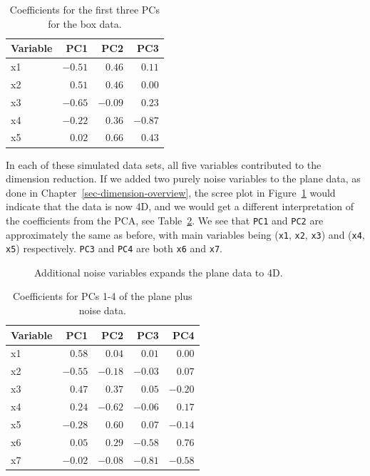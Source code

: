 \documentclass[
  letterpaper,
]{krantz}
\begin{document}
\begin{longtable}{lrrr}

\caption{\label{tbl-box-pcs}Coefficients for the first three PCs for the
box data.}

\tabularnewline

\toprule
Variable & PC1 & PC2 & PC3 \\ 
\midrule\addlinespace[2.5pt]
x1 & $-0.51$ & $0.46$ & $0.11$ \\ 
x2 & $0.51$ & $0.46$ & $0.00$ \\ 
x3 & $-0.65$ & $-0.09$ & $0.23$ \\ 
x4 & $-0.22$ & $0.36$ & $-0.87$ \\ 
x5 & $0.02$ & $0.66$ & $0.43$ \\ 
\bottomrule

\end{longtable}

In each of these simulated data sets, all five variables contributed to
the dimension reduction. If we added two purely noise variables to the
plane data, as done in Chapter~\ref{sec-dimension-overview}, the scree
plot in Figure~\ref{fig-plane-noise-scree} would indicate that the data
is now 4D, and we would get a different interpretation of the
coefficients from the PCA, see Table~\ref{tbl-plane-noise-pcs}. We see
that \texttt{PC1} and \texttt{PC2} are approximately the same as before,
with main variables being (\texttt{x1}, \texttt{x2}, \texttt{x3}) and
(\texttt{x4}, \texttt{x5}) respectively. \texttt{PC3} and \texttt{PC4}
are both \texttt{x6} and \texttt{x7}.

\begin{figure}


\caption{\label{fig-plane-noise-scree}Additional noise variables expands
the plane data to 4D.}

\end{figure}%

\begin{longtable}{lrrrr}

\caption{\label{tbl-plane-noise-pcs}Coefficients for PCs 1-4 of the
plane plus noise data.}

\tabularnewline

\toprule
Variable & PC1 & PC2 & PC3 & PC4 \\ 
\midrule\addlinespace[2.5pt]
x1 & $0.58$ & $0.04$ & $0.01$ & $0.00$ \\ 
x2 & $-0.55$ & $-0.18$ & $-0.03$ & $0.07$ \\ 
x3 & $0.47$ & $0.37$ & $0.05$ & $-0.20$ \\ 
x4 & $0.24$ & $-0.62$ & $-0.06$ & $0.17$ \\ 
x5 & $-0.28$ & $0.60$ & $0.07$ & $-0.14$ \\ 
x6 & $0.05$ & $0.29$ & $-0.58$ & $0.76$ \\ 
x7 & $-0.02$ & $-0.08$ & $-0.81$ & $-0.58$ \\ 
\bottomrule

\end{longtable}
\end{document}
